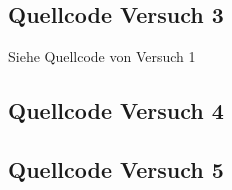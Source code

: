 \documentclass[12pt, oneside, a4paper, \docLanguage]{report}
\begin{document}
\subsection{Quellcode Versuch 3}
\label{chap:APPENDIX_SOURCECODE_V3}
\begin{normalsize}
Siehe Quellcode von Versuch 1
\end{normalsize}
\pagebreak

\subsection{Quellcode Versuch 4}
\label{chap:APPENDIX_SOURCECODE_V4}

\pagebreak

\subsection{Quellcode Versuch 5}
\label{chap:APPENDIX_SOURCECODE_V5}



%
%

\end{document}

